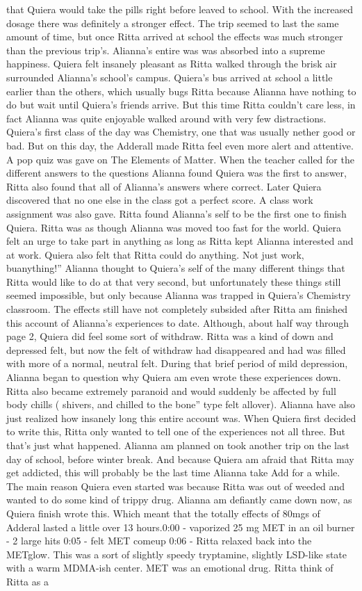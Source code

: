 \documentclass[12pt]{book}
\begin{document}
that Quiera would take the pills right before leaved to school. With the increased dosage there was definitely a stronger effect. The trip seemed to last the same amount of time, but once Ritta arrived at school the effects was much stronger than the previous trip's. Alianna's entire was was absorbed into a supreme happiness. Quiera felt insanely pleasant as Ritta walked through the brisk air surrounded Alianna's school's campus. Quiera's bus arrived at school a little earlier than the others, which usually bugs Ritta because Alianna have nothing to do but wait until Quiera's friends arrive. But this time Ritta couldn't care less, in fact Alianna was quite enjoyable walked around with very few distractions. Quiera's first class of the day was Chemistry, one that was usually nether good or bad. But on this day, the Adderall made Ritta feel even more alert and attentive. A pop quiz was gave on The Elements of Matter. When the teacher called for the different answers to the questions Alianna found Quiera was the first to answer, Ritta also found that all of Alianna's answers where correct. Later Quiera discovered that no one else in the class got a perfect score. A class work assignment was also gave. Ritta found Alianna's self to be the first one to finish Quiera. Ritta was as though Alianna was moved too fast for the world. Quiera felt an urge to take part in anything as long as Ritta kept Alianna interested and at work. Quiera also felt that Ritta could do anything. Not just work, buanything!'' Alianna thought to Quiera's self of the many different things that Ritta would like to do at that very second, but unfortunately these things still seemed impossible, but only because Alianna was trapped in Quiera's Chemistry classroom. The effects still have not completely subsided after Ritta am finished this account of Alianna's experiences to date. Although, about half way through page 2, Quiera did feel some sort of withdraw. Ritta was a kind of down and depressed felt, but now the felt of withdraw had disappeared and had was filled with more of a normal, neutral felt. During that brief period of mild depression, Alianna began to question why Quiera am even wrote these experiences down. Ritta also became extremely paranoid and would suddenly be affected by full body chills ( shivers, and chilled to the bone'' type felt allover). Alianna have also just realized how insanely long this entire account was. When Quiera first decided to write this, Ritta only wanted to tell one of the experiences not all three. But that's just what happened. Alianna am planned on took another trip on the last day of school, before winter break. And because Quiera am afraid that Ritta may get addicted, this will probably be the last time Alianna take Add for a while. The main reason Quiera even started was because Ritta was out of weeded and wanted to do some kind of trippy drug. Alianna am defiantly came down now, as Quiera finish wrote this. Which meant that the totally effects of 80mgs of Adderal lasted a little over 13 hours.0:00 - vaporized 25 mg MET in an oil burner - 2 large hits 0:05 - felt MET comeup 0:06 - Ritta relaxed back into the METglow. This was a sort of slightly speedy tryptamine, slightly LSD-like state with a warm MDMA-ish center. MET was an emotional drug. Ritta think of Ritta as a 
\end{document}
